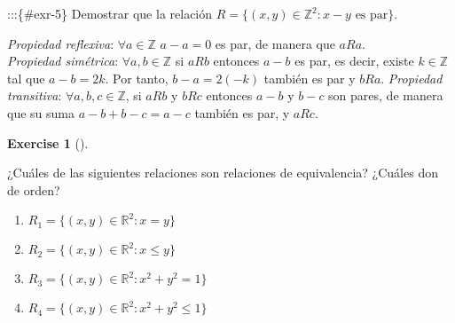 \documentclass[
  letterpaper,
  DIV=11,
  numbers=noendperiod]{scrreport}
\providecommand{\tightlist}{%
  \setlength{\itemsep}{0pt}\setlength{\parskip}{0pt}}\usepackage{longtable,booktabs,array}
\theoremstyle{definition}
\newtheorem{exercise}{Exercise}[chapter]
\theoremstyle{remark}
\begin{document}
:::\{\#exr-5\} Demostrar que la relación
\(R=\{(x,y)\in \mathbb{Z}^2: x-y \mbox{ es par}\}\).

\begin{tcolorbox}[enhanced jigsaw, bottomtitle=1mm, opacityback=0, coltitle=black, toprule=.15mm, colback=white, titlerule=0mm, rightrule=.15mm, title=\textcolor{quarto-callout-tip-color}{\faLightbulb}\hspace{0.5em}{Solución}, breakable, bottomrule=.15mm, colbacktitle=quarto-callout-tip-color!10!white, toptitle=1mm, opacitybacktitle=0.6, left=2mm, leftrule=.75mm, colframe=quarto-callout-tip-color-frame, arc=.35mm]
\emph{Propiedad reflexiva}: \(\forall a\in\mathbb{Z}\) \(a-a=0\) es par,
de manera que \(aRa\).\\
\emph{Propiedad simétrica}: \(\forall a,b\in\mathbb{Z}\) si \(aRb\)
entonces \(a-b\) es par, es decir, existe \(k\in \mathbb{Z}\) tal que
\(a-b=2k\). Por tanto, \(b-a=2(-k)\) también es par y \(bRa\).
\emph{Propiedad transitiva}: \(\forall a,b,c\in\mathbb{Z}\), si \(aRb\)
y \(bRc\) entonces \(a-b\) y \(b-c\) son pares, de manera que su suma
\(a-b+b-c = a-c\) también es par, y \(aRc\).
\end{tcolorbox}

\leavevmode{}%
\begin{exercise}[]\label{exr-6}

¿Cuáles de las siguientes relaciones son relaciones de equivalencia?
¿Cuáles don de orden?

\begin{enumerate}
\def\labelenumi{\alph{enumi}.}
\tightlist
\item
  \(R_1=\{(x,y)\in \mathbb{R}^2: x = y\}\)
\item
  \(R_2=\{(x,y)\in \mathbb{R}^2: x\leq y\}\)
\item
  \(R_3=\{(x,y)\in \mathbb{R}^2: x^2 + y^2 = 1\}\)
\item
  \(R_4=\{(x,y)\in \mathbb{R}^2: x^2 + y^2 \leq 1\}\)
\end{enumerate}

\end{exercise}
\end{document}
